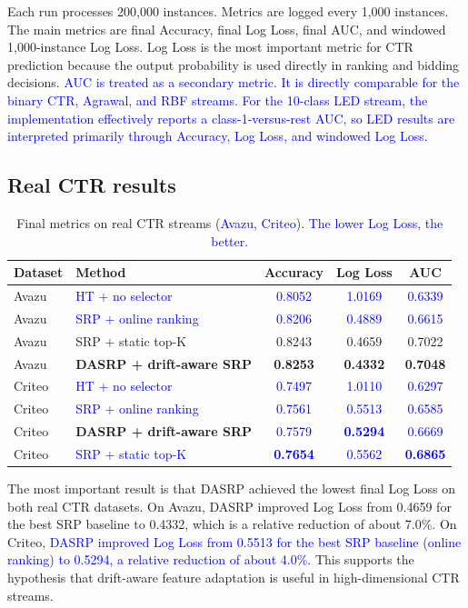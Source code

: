 \documentclass[12pt]{article}
\newcommand{\new}[1]{\textcolor{blue}{#1}}
\begin{document}
Each run processes 200,000 instances. Metrics are logged every 1,000 instances.
The main metrics are final Accuracy, final Log Loss, final AUC, and windowed
1,000-instance Log Loss. Log Loss is the most important metric for CTR
prediction because the output probability is used directly in ranking and
bidding decisions.
\new{AUC is treated as a secondary metric. It is directly comparable for the
binary CTR, Agrawal, and RBF streams. For the 10-class LED stream, the
implementation effectively reports a class-1-versus-rest AUC, so LED results
are interpreted primarily through Accuracy, Log Loss, and windowed Log Loss.}

\subsection{Real CTR results}
\label{subsec:ctr_res}

\begin{table}[H]
\centering
\caption{Final metrics on real CTR streams (\new{Avazu, Criteo}). \new{The lower Log Loss, the better.}}
\label{tab:real_final_metrics}
\begin{tabular}{llccc}
\toprule
Dataset & Method & Accuracy & Log Loss & AUC \\
\midrule
Avazu & \new{HT + no selector} & \new{0.8052} & \new{1.0169} & \new{0.6339} \\
Avazu & \new{SRP + online ranking} & \new{0.8206} & \new{0.4889} & \new{0.6615} \\
Avazu & SRP + static top-K & 0.8243 & 0.4659 & 0.7022 \\
Avazu & \textbf{DASRP + drift-aware SRP} & \textbf{0.8253} & \textbf{0.4332} & \textbf{0.7048} \\
\midrule
Criteo & \new{HT + no selector} & \new{0.7497} & \new{1.0110} & \new{0.6297} \\
Criteo & \new{SRP + online ranking} & \new{0.7561} & \new{0.5513} & \new{0.6585} \\
Criteo & \textbf{DASRP + drift-aware SRP} & \new{0.7579} & \new{\textbf{0.5294}} & \new{0.6669} \\
Criteo & \new{SRP + static top-K} & \new{\textbf{0.7654}} & \new{0.5562} & \new{\textbf{0.6865}} \\
\bottomrule
\end{tabular}
\end{table}

The most important result is that DASRP achieved the lowest final Log Loss on
both real CTR datasets. On Avazu, DASRP improved Log Loss from 0.4659 for the
best SRP baseline to 0.4332, which is a relative reduction of about 7.0\%. On
Criteo, \new{DASRP improved Log Loss from 0.5513 for the best SRP baseline
(online ranking) to 0.5294, a relative reduction of about 4.0\%}. This supports the hypothesis that drift-aware feature adaptation is
useful in high-dimensional CTR streams.
\end{document}
